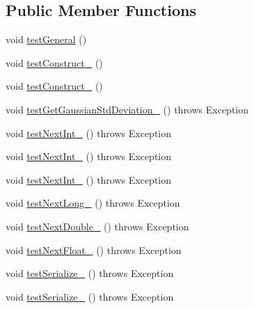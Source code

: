 \subsection*{Public Member Functions}
\begin{DoxyCompactItemize}
\item 
void \hyperlink{classorg_1_1jgap_1_1impl_1_1_gaussian_random_generator_test_a5e9481bf5050a27e0deb47be0de6ee10}{test\-General} ()
\item 
void \hyperlink{classorg_1_1jgap_1_1impl_1_1_gaussian_random_generator_test_a0de6e3144b3ce7aace607a917152aaf9}{test\-Construct\-\_} ()
\item 
void \hyperlink{classorg_1_1jgap_1_1impl_1_1_gaussian_random_generator_test_a3b23f55d2913588b39513aa139147b5a}{test\-Construct\-\_} ()
\item 
void \hyperlink{classorg_1_1jgap_1_1impl_1_1_gaussian_random_generator_test_ace1d14a1c8b90112d955db90b5e22eb8}{test\-Get\-Gaussian\-Std\-Deviation\-\_} ()  throws Exception 
\item 
void \hyperlink{classorg_1_1jgap_1_1impl_1_1_gaussian_random_generator_test_a8ab921aea6e2b0483aa233ad9067318f}{test\-Next\-Int\-\_} ()  throws Exception 
\item 
void \hyperlink{classorg_1_1jgap_1_1impl_1_1_gaussian_random_generator_test_ae6953a010aa57e2f815601fc27035b26}{test\-Next\-Int\-\_} ()  throws Exception 
\item 
void \hyperlink{classorg_1_1jgap_1_1impl_1_1_gaussian_random_generator_test_ab5a6513fa6fcc8173f10399f9cf747e2}{test\-Next\-Int\-\_} ()  throws Exception 
\item 
void \hyperlink{classorg_1_1jgap_1_1impl_1_1_gaussian_random_generator_test_ab5ea72f34e59b06f59c4ad20cdea7f4d}{test\-Next\-Long\-\_} ()  throws Exception 
\item 
void \hyperlink{classorg_1_1jgap_1_1impl_1_1_gaussian_random_generator_test_a00d578aa9b2fa9b4c85ec6543e3f45df}{test\-Next\-Double\-\_} ()  throws Exception 
\item 
void \hyperlink{classorg_1_1jgap_1_1impl_1_1_gaussian_random_generator_test_a3bf03641e964174ebc6c9a726938a911}{test\-Next\-Float\-\_} ()  throws Exception 
\item 
void \hyperlink{classorg_1_1jgap_1_1impl_1_1_gaussian_random_generator_test_a340a0b166f5094800a2e10b63e258bec}{test\-Serialize\-\_} ()  throws Exception 
\item 
void \hyperlink{classorg_1_1jgap_1_1impl_1_1_gaussian_random_generator_test_a9710b02b268a1019979c45a065789341}{test\-Serialize\-\_} ()  throws Exception 
\end{DoxyCompactItemize}
